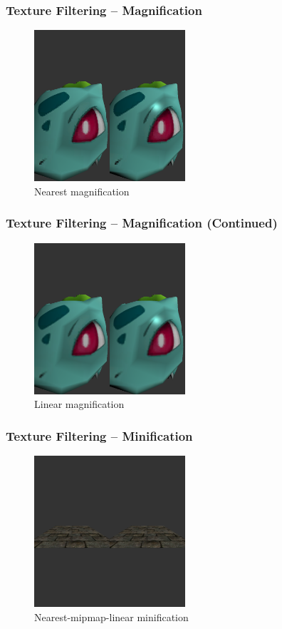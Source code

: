 \documentclass{beamer}
\begin{document}
\begin{frame}
  \frametitle{Texture Filtering -- Magnification}
  \begin{figure}
    \includegraphics[width=0.5\textwidth]{nearest_magnification}
    \caption{Nearest magnification}
  \end{figure}
\end{frame}

\begin{frame}
  \frametitle{Texture Filtering -- Magnification (Continued)}
  \begin{figure}
    \includegraphics[width=0.5\textwidth]{linear_magnification}
    \caption{Linear magnification}
  \end{figure}
\end{frame}

\begin{frame}
  \frametitle{Texture Filtering -- Minification}
  \begin{figure}
    \includegraphics[width=0.5\textwidth]{nearest_minification}
    \caption{Nearest-mipmap-linear minification}
  \end{figure}
\end{frame}
\end{document}
